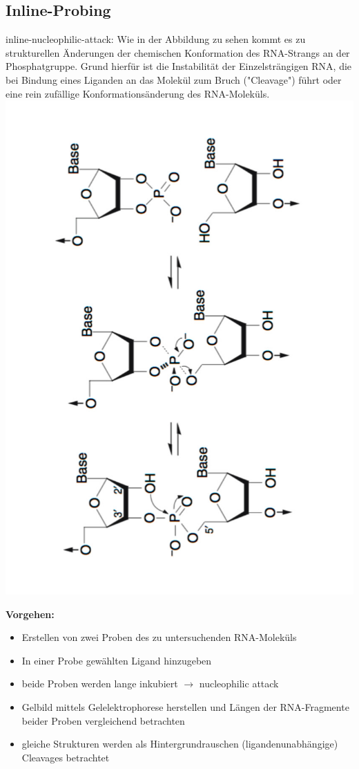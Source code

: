 \subsection{Inline-Probing}
inline-nucleophilic-attack: Wie in der Abbildung zu sehen kommt es zu strukturellen Änderungen der chemischen Konformation des RNA-Strangs an der Phosphatgruppe. Grund hierfür ist die Instabilität der Einzelsträngigen RNA, die bei Bindung eines Liganden an das Molekül zum Bruch ("Cleavage") führt oder eine rein zufällige Konformationsänderung des RNA-Moleküls. \\
\includegraphics[scale=0.25,angle=270]{lectures/160527/pix/inline.jpg}

\textbf{Vorgehen:}
\begin{itemize}
\item Erstellen von zwei Proben des zu untersuchenden RNA-Moleküls
\item In einer Probe gewählten Ligand hinzugeben
\item beide Proben werden lange inkubiert $\rightarrow$ nucleophilic attack
\item Gelbild mittels Gelelektrophorese herstellen und Längen der RNA-Fragmente beider Proben vergleichend betrachten
\item gleiche Strukturen werden als Hintergrundrauschen (ligandenunabhängige) Cleavages betrachtet
\end{itemize}

